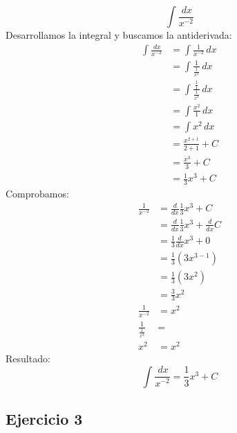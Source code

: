\documentclass[letterpaper]{article}
\begin{document}
		\vspace{0.5cm}
		\[ \int \frac{\, dx}{x^{-2}} \]
		\vspace{0.5cm}
		\vspace{0.2cm}
		Desarrollamos la integral y buscamos la antiderivada:
		\begin{align*}
			\int \frac{\, dx}{x^{-2}} &= \int \frac{1}{x^{-2}} \, dx \\
			&= \int \frac{1}{ \frac{1}{x^2} } \, dx \\
			&= \int \frac{ \frac{1}{1} }{ \frac{1}{x^2} } \, dx \\
			&= \int \frac{x^2}{1} \, dx \\
			&= \int x^2 \, dx \\
			&= \frac{x^{2 + 1}}{2 + 1} + C \\
			&= \frac{x^3}{3} + C \\
			&= \frac{1}{3} x^3 + C
		\end{align*}
		\vspace{0.2cm}
		Comprobamos:
		\begin{align*}
			\frac{1}{x^{-2}} &= \frac{d}{dx} \frac{1}{3} x^3 + C \\
			&= \frac{d}{dx} \frac{1}{3} x^3 + \frac{d}{dx} C \\
			&= \frac{1}{3} \frac{d}{dx} x^3 + 0 \\
			&= \frac{1}{3} \left( 3 x^{3 - 1} \right) \\
			&= \frac{1}{3} \left( 3 x^2 \right) \\
			&= \frac{3}{3} x^2 \\
			\frac{1}{x^{-2}} &= x^2 \\
			\frac{1}{ \frac{1}{x^2}} &= \\
			x^2 &= x^2
		\end{align*}
		\vspace{0.2cm}
		Resultado:
		\[ \int \frac{\, dx}{x^{-2}} = \frac{1}{3} x^3 + C \]
		
	\subsection*{Ejercicio 3} %
		
\end{document}
